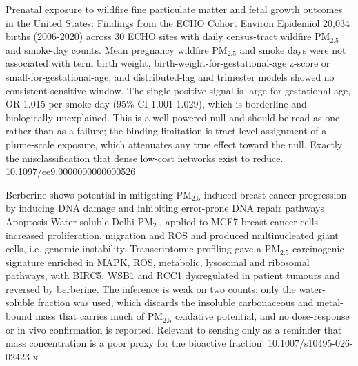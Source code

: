 \documentclass[10pt]{article}
\begin{document}

{Prenatal exposure to wildfire fine particulate matter and fetal growth outcomes in the United States: Findings from the ECHO Cohort}
{Environ Epidemiol}
{20,034 births (2006-2020) across 30 ECHO sites with daily census-tract wildfire PM$_{2.5}$ and smoke-day counts. Mean pregnancy wildfire PM$_{2.5}$ and smoke days were not associated with term birth weight, birth-weight-for-gestational-age z-score or small-for-gestational-age, and distributed-lag and trimester models showed no consistent sensitive window. The single positive signal is large-for-gestational-age, OR 1.015 per smoke day (95\% CI 1.001-1.029), which is borderline and biologically unexplained. This is a well-powered null and should be read as one rather than as a failure; the binding limitation is tract-level assignment of a plume-scale exposure, which attenuates any true effect toward the null. Exactly the misclassification that dense low-cost networks exist to reduce.}
{10.1097/ee9.0000000000000526}


{Berberine shows potential in mitigating PM$_{2.5}$-induced breast cancer progression by inducing DNA damage and inhibiting error-prone DNA repair pathways}
{Apoptosis}
{Water-soluble Delhi PM$_{2.5}$ applied to MCF7 breast cancer cells increased proliferation, migration and ROS and produced multinucleated giant cells, i.e. genomic instability. Transcriptomic profiling gave a PM$_{2.5}$ carcinogenic signature enriched in MAPK, ROS, metabolic, lysosomal and ribosomal pathways, with BIRC5, WSB1 and RCC1 dysregulated in patient tumours and reversed by berberine. The inference is weak on two counts: only the water-soluble fraction was used, which discards the insoluble carbonaceous and metal-bound mass that carries much of PM$_{2.5}$ oxidative potential, and no dose-response or in vivo confirmation is reported. Relevant to sensing only as a reminder that mass concentration is a poor proxy for the bioactive fraction.}
{10.1007/s10495-026-02423-x}
\end{document}
